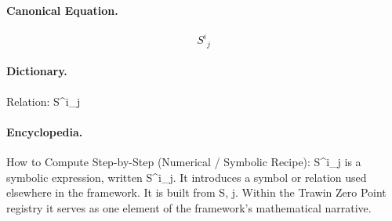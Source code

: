 \paragraph{Canonical Equation.}
\[
S^i{}_j
\]

\paragraph{Dictionary.}
Relation: S\textasciicircum{}i\_j

\paragraph{Encyclopedia.}
How to Compute Step-by-Step (Numerical / Symbolic Recipe): S\textasciicircum{}i\_j is a symbolic expression, written S\textasciicircum{}i\_j. It introduces a symbol or relation used elsewhere in the framework. It is built from S, j. Within the Trawin Zero Point registry it serves as one element of the framework's mathematical narrative.
